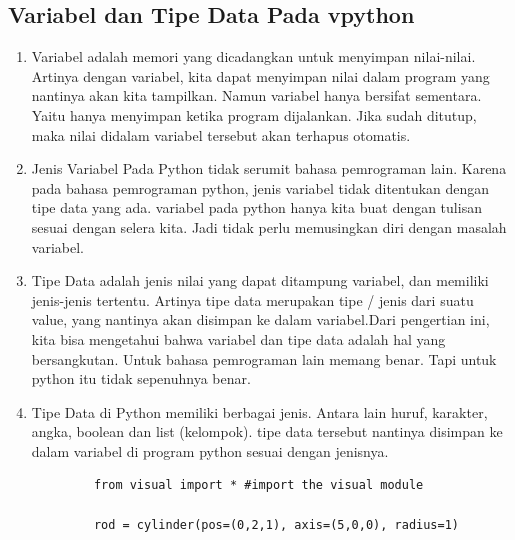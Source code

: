 \subsection{Variabel dan Tipe Data Pada vpython}	
		\begin{enumerate}
			\item Variabel adalah memori yang dicadangkan untuk menyimpan nilai-nilai. Artinya dengan variabel, kita dapat menyimpan nilai dalam program yang nantinya akan kita tampilkan. Namun variabel hanya bersifat sementara. Yaitu hanya menyimpan ketika program dijalankan. Jika sudah ditutup, maka nilai didalam variabel tersebut akan terhapus otomatis.
			\item Jenis Variabel Pada Python tidak serumit bahasa pemrograman lain. Karena pada bahasa pemrograman python, jenis variabel tidak ditentukan dengan tipe data yang ada. variabel pada python hanya kita buat dengan tulisan sesuai dengan selera kita. Jadi tidak perlu memusingkan diri dengan masalah variabel.
			\item Tipe Data adalah jenis nilai yang dapat ditampung variabel, dan memiliki jenis-jenis tertentu. Artinya tipe data merupakan tipe / jenis dari suatu value, yang nantinya akan disimpan ke dalam variabel.Dari pengertian ini, kita bisa mengetahui bahwa variabel dan tipe data adalah hal yang bersangkutan. Untuk bahasa pemrograman lain memang benar. Tapi untuk python itu tidak sepenuhnya benar.  
			\item Tipe Data di Python memiliki berbagai jenis. Antara lain huruf, karakter, angka, boolean dan list (kelompok). tipe data tersebut nantinya disimpan ke dalam variabel di program python sesuai dengan jenisnya. 
		\end{enumerate}
		\begin{verbatim}
			from visual import * #import the visual module

			rod = cylinder(pos=(0,2,1), axis=(5,0,0), radius=1)
		\end{verbatim}
